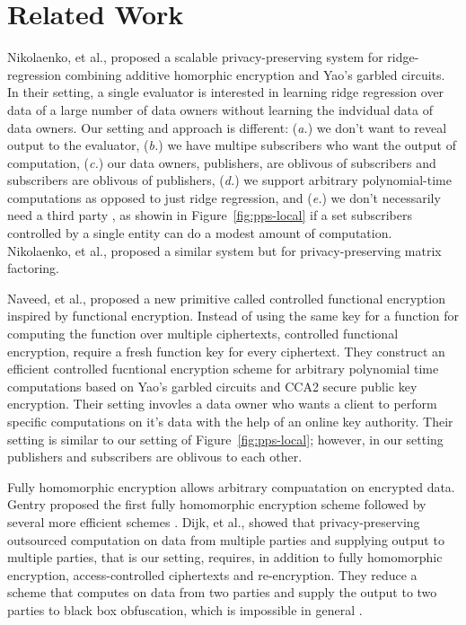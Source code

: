 \section{Related Work}
\label{sec:related}

Nikolaenko, et al., \cite{nikolaenko2013privacy} proposed a scalable
privacy-preserving system for ridge-regression combining additive homorphic
encryption and Yao's garbled circuits.  In their setting, a single evaluator is
interested in learning ridge regression over data of a large number of data
owners without learning the indvidual data of data owners. Our setting and
approach is different: (\emph{a.}) we don't want to reveal output to the
evaluator, (\emph{b.}) we have multipe subscribers who want the output of
computation, (\emph{c.}) our data owners, publishers, are oblivous of
subscribers and subscribers are oblivous of publishers, (\emph{d.}) we support
arbitrary polynomial-time computations as opposed to just ridge regression, and
(\emph{e.}) we don't necessarily need a third party \garbler, as showin in
Figure~\ref{fig:pps-local} if a set subscribers controlled by a single entity
can do a modest amount of computation. Nikolaenko, et
al.,\cite{nikolaenko2013privacy} proposed a similar system but for
privacy-preserving matrix factoring.

Naveed, et al., \cite{naveed2014controlled} proposed a new primitive called
controlled functional encryption inspired by functional encryption. Instead of
using the same key for a function for computing the function over multiple
ciphertexts, controlled functional encryption, require a fresh function key for
every ciphertext. They construct an efficient controlled fucntional encryption
scheme for arbitrary polynomial time computations based on Yao's garbled
circuits and CCA2 secure public key encryption. Their setting invovles a data
owner who wants a client to perform specific computations on it's data with the
help of an online key authority. Their setting is similar to our setting of
Figure~\ref{fig:pps-local}; however, in our setting publishers and subscribers
are oblivous to each other.

Fully homomorphic encryption allows arbitrary compuatation on encrypted data.
Gentry proposed the first fully homomorphic encryption
scheme \cite{brakerski2011fully,gentry2009fully} followed by several more
efficient schemes \cite{brakerski2014leveled}. Dijk, et
al., \cite{van2010impossibility} showed that privacy-preserving outsourced
computation on data from multiple parties and supplying output to multiple
parties, that is our setting, requires, in addition to fully homomorphic
encryption, access-controlled ciphertexts and re-encryption. They reduce a
scheme that computes on data from two parties and supply the output to two
parties to black box obfuscation, which is impossible in
general \cite{barak2001possibility}.

